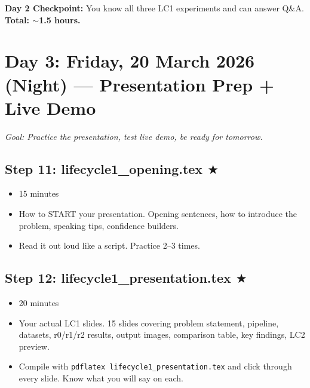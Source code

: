 \documentclass[12pt,a4paper]{article}
\begin{document}
\vspace{0.3cm}
\noindent\textbf{Day 2 Checkpoint:} You know all three LC1 experiments and can answer Q\&A. \textbf{Total: $\sim$1.5 hours.}

\section{Day 3: Friday, 20 March 2026 (Night) --- Presentation Prep + Live Demo}

\noindent\textit{Goal: Practice the presentation, test live demo, be ready for tomorrow.}

\begin{center}
\end{center}

\subsection*{Step 11: lifecycle1\_opening.tex $\bigstar$}
\begin{itemize}[leftmargin=1.5cm]
    \item[\textbf{Time:}] 15 minutes
    \item[\textbf{What you learn:}] How to START your presentation. Opening sentences, how to introduce the problem, speaking tips, confidence builders.
    \item[\textbf{Action:}] Read it out loud like a script. Practice 2--3 times.
\end{itemize}

\subsection*{Step 12: lifecycle1\_presentation.tex $\bigstar$}
\begin{itemize}[leftmargin=1.5cm]
    \item[\textbf{Time:}] 20 minutes
    \item[\textbf{What you learn:}] Your actual LC1 slides. 15 slides covering problem statement, pipeline, datasets, r0/r1/r2 results, output images, comparison table, key findings, LC2 preview.
    \item[\textbf{Action:}] Compile with \texttt{pdflatex lifecycle1\_presentation.tex} and click through every slide. Know what you will say on each.
\end{itemize}
\end{document}
